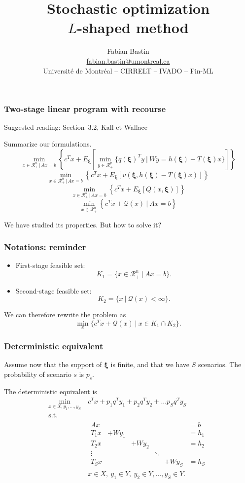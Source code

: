 \documentclass{beamer}
\author[Fabian Bastin]{Fabian Bastin \\ \url{fabian.bastin@umontreal.ca} \\ Université de Montréal -- CIRRELT -- IVADO -- Fin-ML}
\date{}
\title[$L$-shaped method]{Stochastic optimization\\$L$-shaped method}
\def\bxi{\boldsymbol\xi}
\def\bxi{\boldsymbol\xi}
\def\rit{\mathcal{R}}
\begin{document}
\frame{\titlepage}

\begin{frame}
\frametitle{Two-stage linear program with recourse}

{\red Suggested reading: Section~3.2, Kall et Wallace}

\mbox{}

Summarize our formulations.
\[
\min_{x \in \rit^n_+ \,|\, Ax = b} \left\lbrace c^Tx + E_{\bxi} \left[ \min_{y \in \rit^p_+} \lbrace q(\bxi)^Ty \ |\ Wy = h(\bxi) - T(\bxi)x \rbrace \right] \right\rbrace 
\]
\[
\min_{x \in \rit^n_+ \,|\, Ax = b} \left\lbrace c^Tx + E_{\bxi}
  \left[  v(\bxi, h(\bxi)-T(\bxi)x) \right] \right\rbrace 
\]
\[
\min_{x \in \rit^n_+ \,|\, Ax = b} \left\lbrace c^Tx + E_{\bxi} \left[ Q(x,\bxi) \right] \right\rbrace 
\]
\[
\min_{x \in \rit^n_+} \left\lbrace c^Tx + \mathcal{Q}(x)
  \ |\ Ax = b \right\rbrace 
\]

We have studied its properties. But how to solve it?

\end{frame}

\begin{frame}
\frametitle{Notations: reminder}

\begin{itemize}
\item
First-stage feasible set:
\[
K_1 = \lbrace x \in \rit^n_+ \ |\ Ax = b \rbrace.
\]
\item
Second-stage feasible set:
\[
K_2 = \lbrace x \ |\ \mathcal{Q}(x) < \infty \rbrace.
\]
\end{itemize}
We can therefore rewrite the problem as
\[
\min_x \lbrace c^Tx + \mathcal{Q}(x) \ |\ x \in K_1 \cap K_2 \rbrace.
\]



\end{frame}

\begin{frame}
\frametitle{Deterministic equivalent}

Assume now that the support of $\bxi$ is finite, and that we have $S$ scenarios.
The probability of scenario $s$ is $p_s$.

\mbox{}

The deterministic equivalent is
\begin{align*}
\min_{x \in X, y_1, \ldots, y_S}\ & c^T x + p_1 q^T y_1 + p_2 q^T y_2 + \ldots
p_S q^Ty_S \\
\mbox{s.t. } & \\
& \begin{matrix} Ax & & & & & = b\\
T_1 x & + W y_1 & & & & = h_1 \\
T_2 x & & + W y_2 & & & = h_2 \\
\vdots & & & \ddots & \\
T_S x & & & & + W y_S & = h_S
\end{matrix} \\
& x \in X,\ y_1 \in Y,\ y_2 \in Y,\ldots, y_S \in Y.
\end{align*}

\end{frame}
\end{document}
